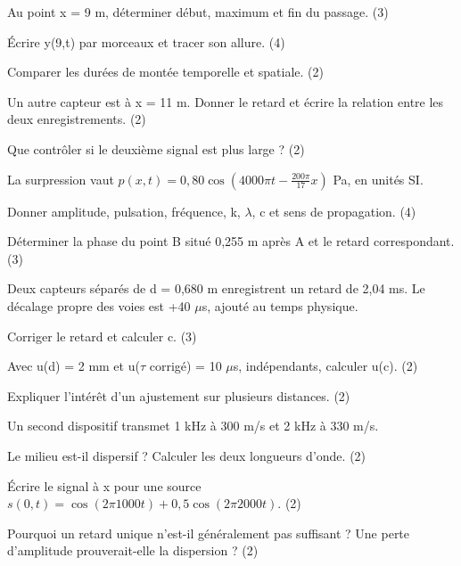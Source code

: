 \begin{questions}
\item Au point x = 9 m, déterminer début, maximum et fin du passage. (3)
\item Écrire y(9,t) par morceaux et tracer son allure. (4)
\item Comparer les durées de montée temporelle et spatiale. (2)
\end{questions}

\begin{questions}
\item Un autre capteur est à x = 11 m. Donner le retard et écrire la relation entre les deux enregistrements. (2)
\item Que contrôler si le deuxième signal est plus large ? (2)
\end{questions}



La surpression vaut $p(x,t)=0{,}80\cos(4000\pi t-\frac{200\pi}{17}x)$ Pa, en unités SI.\begin{questions}
\item Donner amplitude, pulsation, fréquence, k, \ensuremath{\lambda}, c et sens de propagation. (4)
\item Déterminer la phase du point B situé 0,255 m après A et le retard correspondant. (3)
\end{questions}

Deux capteurs séparés de d = 0,680 m enregistrent un retard de 2,04 ms. Le décalage propre des voies est +40 \ensuremath{\mu}s, ajouté au temps physique.\begin{questions}
\item Corriger le retard et calculer c. (3)
\item Avec u(d) = 2 mm et u(\ensuremath{\tau} corrigé) = 10 \ensuremath{\mu}s, indépendants, calculer u(c). (2)
\item Expliquer l’intérêt d’un ajustement sur plusieurs distances. (2)
\end{questions}



Un second dispositif transmet 1 kHz à 300 m/s et 2 kHz à 330 m/s.\begin{questions}
\item Le milieu est-il dispersif ? Calculer les deux longueurs d’onde. (2)
\item Écrire le signal à x pour une source $s(0,t)=\cos(2\pi1000t)+0{,}5\cos(2\pi2000t)$. (2)
\item Pourquoi un retard unique n’est-il généralement pas suffisant ? Une perte d’amplitude prouverait-elle la dispersion ? (2)
\end{questions}

